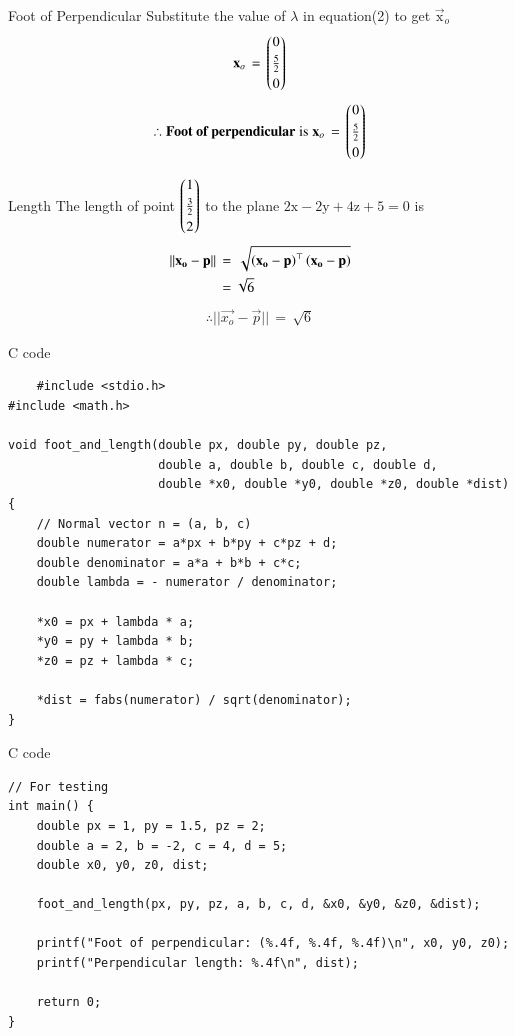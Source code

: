 \documentclass{beamer}
\begin{document}
\begin{frame}{Foot of Perpendicular}
    Substitute the value of $\lambda$ in equation(2) to get $\vec{\text{x}}_o$
\begin{align}
    \mathbf{x}_o\,=\,\begin{pmatrix}0\\[3pt]\frac{5}{2}\\[3pt]0\end{pmatrix}
\end{align}
\begin{align*}
    \therefore \textbf{Foot of perpendicular}\; \text{is}\; \mathbf{x}_o\,=\,\begin{pmatrix}0\\[3pt]\frac{5}{2}\\[3pt]0\end{pmatrix}
    \end{align*}
\end{frame}

\begin{frame}{Length}
    The length of point $\begin{pmatrix}1\\[3pt]\frac{3}{2}\\[3pt]2\end{pmatrix}$ to the plane $2\text{x}-2\text{y}+4\text{z}+5=0$ is
\begin{align}
    ||\mathbf{x_o}-\mathbf{p}||\,&=\,\sqrt{\left(\mathbf{x_o}-\mathbf{p}\right)^\top\left(\mathbf{x_o}-\mathbf{p}\right)}\\
    &=\sqrt{6}
\end{align}
\begin{align*}
    \therefore ||\vec{x_o}-\vec{p}||\,=\,\sqrt{6}
\end{align*}
\end{frame}

\begin{frame}[fragile]{C code}
\begin{lstlisting}
    #include <stdio.h>
#include <math.h>

void foot_and_length(double px, double py, double pz,
                     double a, double b, double c, double d,
                     double *x0, double *y0, double *z0, double *dist) {
    // Normal vector n = (a, b, c)
    double numerator = a*px + b*py + c*pz + d;
    double denominator = a*a + b*b + c*c;
    double lambda = - numerator / denominator;

    *x0 = px + lambda * a;
    *y0 = py + lambda * b;
    *z0 = pz + lambda * c;

    *dist = fabs(numerator) / sqrt(denominator);
}
\end{lstlisting}
\end{frame}

\begin{frame}[fragile]{C code}
\begin{lstlisting}
// For testing
int main() {
    double px = 1, py = 1.5, pz = 2;
    double a = 2, b = -2, c = 4, d = 5;
    double x0, y0, z0, dist;

    foot_and_length(px, py, pz, a, b, c, d, &x0, &y0, &z0, &dist);

    printf("Foot of perpendicular: (%.4f, %.4f, %.4f)\n", x0, y0, z0);
    printf("Perpendicular length: %.4f\n", dist);

    return 0;
}
\end{lstlisting}
\end{frame}
\end{document}
